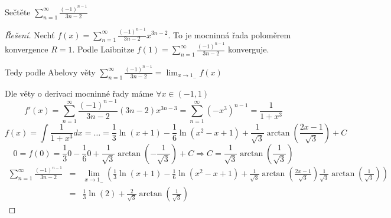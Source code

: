 \begin{priklad}
Sečtěte $\sum_{n=1}^{\infty} \frac{(-1)^{n-1}}{3n-2}$
\end{priklad}

\begin{proof}[Řešení]
Nechť $f(x) = \sum_{n=1}^{\infty} \frac{(-1)^{n-1}}{3n-2} x^{3n-2}$. To je mocninná řada poloměrem konvergence $R=1$. Podle Laibnitze $f(1) = \sum_{n=1}^{\infty} \frac{(-1)^{n-1}}{3n-2}$ konverguje. 

Tedy podle Abelovy věty $\sum_{n=1}^{\infty} \frac{(-1)^{n-1}}{3n-2} = \lim_{x \rightarrow 1_-} f(x)$

Dle věty o derivaci mocninné řady máme $\forall x \in (-1, 1)$
$$f'(x) = \sum_{n=1}^{\infty} \frac{(-1)^{n-1}}{3n-2} (3n-2) x^{3n-3} = \sum_{n=1}^{\infty} \left( -x^3 \right)^{n-1} = \frac{1}{1+x^3}$$
$$f(x) = \int \frac{1}{1+x^3} dx = \ldots = \frac{1}{3} \ln(x+1) - \frac{1}{6} \ln(x^2-x+1) + \frac{1}{\sqrt{3}} \arctan \left( \frac{2x-1}{\sqrt{3}} \right) + C$$
$$0 = f(0) = \frac{1}{3} 0 - \frac{1}{6} 0 + \frac{1}{\sqrt{3}} \arctan \left( - \frac{1}{\sqrt{3}} \right) + C \Rightarrow C = \frac{1}{\sqrt{3}} \arctan \left( \frac{1}{\sqrt{3}} \right)$$
\begin{eqnarray*}
\sum_{n=1}^{\infty} \frac{(-1)^{n-1}}{3n-2} & = & \lim_{x \rightarrow 1_-} \left( \frac{1}{3} \ln(x+1) - \frac{1}{6} \ln(x^2-x+1) + \frac{1}{\sqrt{3}} \arctan \left( \frac{2x-1}{\sqrt{3}} \right) \frac{1}{\sqrt{3}} \arctan \left( \frac{1}{\sqrt{3}} \right) \right) \\
& = & \frac{1}{3} \ln(2) + \frac{2}{\sqrt{3}} \arctan \left( \frac{1}{\sqrt{3}} \right) 
\end{eqnarray*}
\end{proof}
